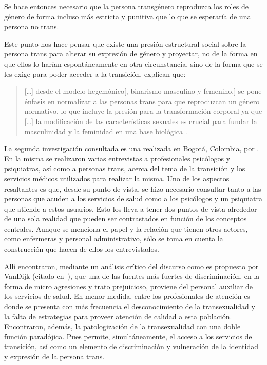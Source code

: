 Se hace entonces necesario que la persona transgénero reproduzca los roles de
género de forma incluso más estricta y punitiva que lo que se esperaría de una
persona no trans.

Este punto nos hace pensar que existe una presión estructural social sobre la
persona trans para alterar su expresión de género y proyectar, no de la forma en
que ellos lo harían espontáneamente en otra circunstancia, sino de la forma que
se les exige para poder acceder a la transición. \textcite{Coll-Planas2015}
explican que:

\begin{quote}
[…] desde el modelo hegemónico[, binarismo masculino y femenino,] se pone
énfasis en normalizar a las personas trans para que reproduzcan un género
normativo, lo que incluye la presión para la transformación corporal ya que […]
la modificación de las características sexuales es crucial para fundar la
masculinidad y la feminidad en una base biológica \parencite[][p.
427]{Coll-Planas2015}.
\end{quote}

La segunda investigación consultada es una realizada en Bogotá,
Colombia, por \textcite{LassoBaez2014}. En la misma se realizaron varias
entrevistas a profesionales psicólogos y psiquiatras, así como a personas trans,
acerca del tema de la transición y los servicios médicos utilizados para
realizar la misma. Uno de los aspectos resaltantes es que, desde su punto de
vista, se hizo necesario consultar tanto a las personas que acuden a los
servicios de salud como a los psicólogos y un psiquiatra que atiende a estos
usuarios. Esto los lleva a tener dos puntos de vista alrededor de una sola
realidad que pueden ser contrastados en función de los conceptos centrales.
Aunque se menciona el papel y la relación que tienen otros actores, como
enfermeras y personal administrativo, sólo se toma en cuenta la construcción que
hacen de ellos los entrevistados.

Allí encontraron, mediante un análisis crítico del discurso como es propuesto
por VanDijk (citado en~\cite[][p. 111]{LassoBaez2014}), que una de las fuentes
más fuertes de discriminación, en la forma de micro agresiones y trato
prejuicioso, proviene del personal auxiliar de los servicios de salud. En menor
medida, entre los profesionales de atención es donde se presenta con más
frecuencia el desconocimiento de la transexualidad y la falta de estrategias para
proveer atención de calidad a esta población. Encontraron, además, la
patologización de la transexualidad con una doble función paradójica. Pues
permite, simultáneamente, el acceso a los servicios de transición, así como un
elemento de discriminación y vulneración de la identidad y expresión de la
persona trans.

